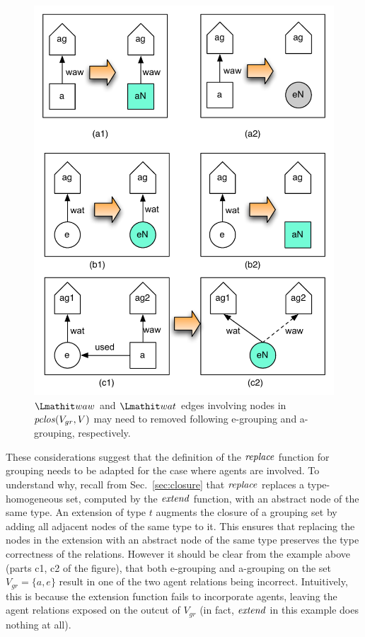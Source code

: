 \begin{figure}
\centering
\includegraphics[scale=.5]{figures/agents-relations-patterns}
\caption{$\waw$ and $\wat$ edges involving nodes in $\mathit{pclos}(V_{gr}, V)$ may need to removed following e-grouping and a-grouping, respectively.}  \label{fig:agents-relations-patterns}
\end{figure}

%
These considerations suggest that the definition of the $\mathit{replace}$ function for grouping needs to be adapted for the case where agents are involved. 
%
To understand why, recall from Sec.~\ref{sec:closure} that $\mathit{replace}$ replaces a type-homogeneous set, computed by the $\mathit{extend}$ function, with an abstract node of the same type. An extension of type $t$ augments the closure of a grouping set by adding all adjacent nodes of the same type to it. This ensures that replacing the nodes in the extension with an abstract node of the same type preserves the type correctness of the relations. 
%
However it should be clear from the example above (parts c1, c2 of the figure), that both e-grouping and a-grouping on the set  $V_{gr} = \{ a, e\}$  result in one of the two agent relations being incorrect. Intuitively, this is because the extension function fails to incorporate agents, leaving the agent relations exposed on the outcut of $V_{gr}$ (in fact, $\mathit{extend}$ in this example does nothing at all).

